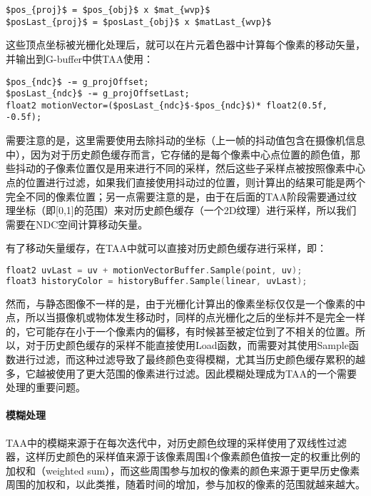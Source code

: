 \begin{lstlisting}[mathescape=true]
$pos_{proj}$ = $pos_{obj}$ x $mat_{wvp}$
$posLast_{proj}$ = $posLast_{obj}$ x $matLast_{wvp}$
\end{lstlisting}

这些顶点坐标被光栅化处理后，就可以在片元着色器中计算每个像素的移动矢量，并输出到G-buffer中供TAA使用：

\begin{lstlisting}[mathescape=true]
$pos_{ndc}$ -= g_projOffset;
$posLast_{ndc}$ -= g_projOffsetLast;
float2 motionVector=($posLast_{ndc}$-$pos_{ndc}$)* float2(0.5f, -0.5f);
\end{lstlisting}

需要注意的是，这里需要使用去除抖动的坐标（上一帧的抖动值包含在摄像机信息中），因为对于历史颜色缓存而言，它存储的是每个像素中心点位置的颜色值，那些抖动的子像素位置仅是用来进行不同的采样，然后这些子采样点被按照像素中心点的位置进行过滤，如果我们直接使用抖动过的位置，则计算出的结果可能是两个完全不同的像素位置；另一点需要注意的是，由于在后面的TAA阶段需要通过纹理坐标（即[0,1]的范围）来对历史颜色缓存（一个2D纹理）进行采样，所以我们需要在NDC空间计算移动矢量。

有了移动矢量缓存，在TAA中就可以直接对历史颜色缓存进行采样，即：

\begin{lstlisting}[language=C++]
float2 uvLast = uv + motionVectorBuffer.Sample(point, uv);
float3 historyColor = historyBuffer.Sample(linear, uvLast);
\end{lstlisting}

然而，与静态图像不一样的是，由于光栅化计算出的像素坐标仅仅是一个像素的中点，所以当摄像机或物体发生移动时，同样的点光栅化之后的坐标并不是完全一样的，它可能存在小于一个像素内的偏移，有时候甚至被定位到了不相关的位置\cite{a:TemporalAntialiasingInUncharted4}。所以，对于历史颜色缓存的采样不能直接使用Load函数，而需要对其使用Sample函数进行过滤，而这种过滤导致了最终颜色变得模糊，尤其当历史颜色缓存累积的越多，它越被使用了更大范围的像素进行过滤。因此模糊处理成为TAA的一个需要处理的重要问题。







\paragraph{模糊处理}
TAA中的模糊来源于在每次迭代中，对历史颜色纹理的采样使用了双线性过滤器，这样历史颜色的采样值来源于该像素周围4个像素颜色值按一定的权重比例的加权和（weighted sum），而这些周围参与加权的像素的颜色来源于更早历史像素周围的加权和，以此类推，随着时间的增加，参与加权的像素的范围就越来越大。

